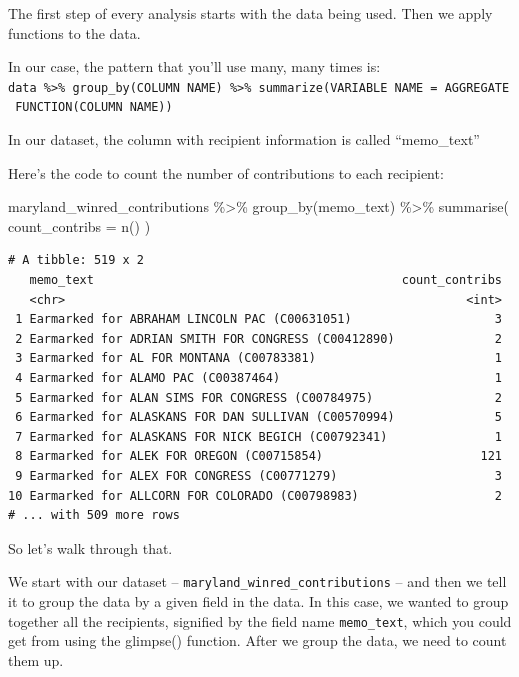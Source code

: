 \documentclass[
  letterpaper,
  DIV=11,
  numbers=noendperiod]{scrreprt}
\newenvironment{Shaded}{\begin{snugshade}}{\end{snugshade}}
\newcommand{\AttributeTok}[1]{\textcolor[rgb]{0.40,0.45,0.13}{#1}}
\newcommand{\FunctionTok}[1]{\textcolor[rgb]{0.28,0.35,0.67}{#1}}
\newcommand{\NormalTok}[1]{\textcolor[rgb]{0.00,0.23,0.31}{#1}}
\newcommand{\SpecialCharTok}[1]{\textcolor[rgb]{0.37,0.37,0.37}{#1}}
\begin{document}
The first step of every analysis starts with the data being used. Then
we apply functions to the data.

In our case, the pattern that you'll use many, many times is:
\texttt{data\ \%\textgreater{}\%\ group\_by(COLUMN\ NAME)\ \%\textgreater{}\%\ summarize(VARIABLE\ NAME\ =\ AGGREGATE\ FUNCTION(COLUMN\ NAME))}

In our dataset, the column with recipient information is called
``memo\_text''

Here's the code to count the number of contributions to each recipient:

\begin{Shaded}
\begin{Highlighting}[]
\NormalTok{maryland\_winred\_contributions }\SpecialCharTok{\%\textgreater{}\%}
  \FunctionTok{group\_by}\NormalTok{(memo\_text) }\SpecialCharTok{\%\textgreater{}\%}
  \FunctionTok{summarise}\NormalTok{(}
    \AttributeTok{count\_contribs =} \FunctionTok{n}\NormalTok{()}
\NormalTok{  )}
\end{Highlighting}
\end{Shaded}

\begin{verbatim}
# A tibble: 519 x 2
   memo_text                                           count_contribs
   <chr>                                                        <int>
 1 Earmarked for ABRAHAM LINCOLN PAC (C00631051)                    3
 2 Earmarked for ADRIAN SMITH FOR CONGRESS (C00412890)              2
 3 Earmarked for AL FOR MONTANA (C00783381)                         1
 4 Earmarked for ALAMO PAC (C00387464)                              1
 5 Earmarked for ALAN SIMS FOR CONGRESS (C00784975)                 2
 6 Earmarked for ALASKANS FOR DAN SULLIVAN (C00570994)              5
 7 Earmarked for ALASKANS FOR NICK BEGICH (C00792341)               1
 8 Earmarked for ALEK FOR OREGON (C00715854)                      121
 9 Earmarked for ALEX FOR CONGRESS (C00771279)                      3
10 Earmarked for ALLCORN FOR COLORADO (C00798983)                   2
# ... with 509 more rows
\end{verbatim}

So let's walk through that.

We start with our dataset -- \texttt{maryland\_winred\_contributions} --
and then we tell it to group the data by a given field in the data. In
this case, we wanted to group together all the recipients, signified by
the field name \texttt{memo\_text}, which you could get from using the
glimpse() function. After we group the data, we need to count them up.
\end{document}
